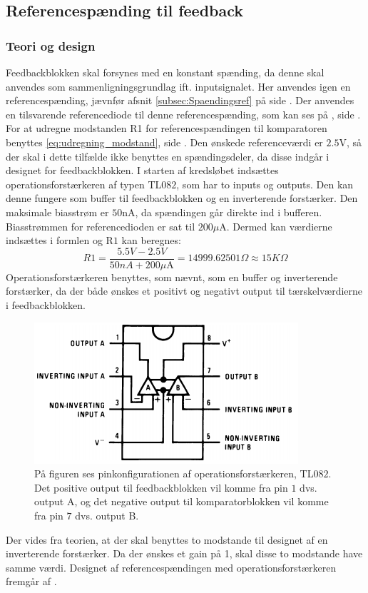 \subsection{Referencespænding til feedback}\label{subsec:Spaendingsref_Komparator}
\subsubsection{Teori og design}
Feedbackblokken skal forsynes med en konstant spænding, da denne skal anvendes som sammenligningsgrundlag ift. inputsignalet. Her anvendes igen en referencespænding, jævnfør afsnit \ref{subsec:Spaendingsref} på side \pageref{subsec:Spaendingsref}. Der anvendes en tilsvarende referencediode til denne referencespænding, som kan ses på , side \pageref{subsec:Spaendingsref}. \\
For at udregne modstanden R1 for referencespændingen til komparatoren benyttes \eqref{eq:udregning_modstand}, side \pageref{eq:udregning_modstand}. Den ønskede referenceværdi er $2.5$V, så der skal i dette tilfælde ikke benyttes en spændingsdeler, da disse indgår i designet for feedbackblokken. I starten af kredsløbet indsættes operationsforstærkeren af typen TL$082$, som har to inputs og outputs. \cite{Corporation2013} Den kan denne fungere som buffer til feedbackblokken og en inverterende forstærker. \cite{Schaumann2014} Den maksimale biasstrøm er $50$nA, da spændingen går direkte ind i bufferen. Biasstrømmen for referencedioden er sat til $200\mu$A. Dermed kan værdierne indsættes i formlen og R$1$ kan beregnes:
\begin{equation}
R1 = \frac{5.5V-2.5V}{50nA + 200\mu\text{A}} = 14999.62501\Omega \approx 15K\Omega 
\end{equation} 
Operationsforstærkeren benyttes, som nævnt, som en buffer og inverterende forstærker, da der både ønskes et positivt og negativt output til tærskelværdierne i feedbackblokken.
\begin{figure}[H]
	\centering
	\includegraphics[scale=0.8]{figures/cProblemloesning/TL082.PNG}
	\caption{På figuren ses pinkonfigurationen af operationsforstærkeren, TL$082$. Det positive output til feedbackblokken vil komme fra pin $1$ dvs. output A, og det negative output til komparatorblokken vil komme fra pin $7$ dvs. output B. \cite{Corporation2013}}
	\label{fig:TL082}
\end{figure}
\noindent Der vides fra teorien, at der skal benyttes to modstande til designet af en inverterende forstærker. Da der ønskes et gain på 1, skal disse to modstande have samme værdi. \cite{Nilsson2011} Designet af referencespændingen med operationsforstærkeren fremgår af .

